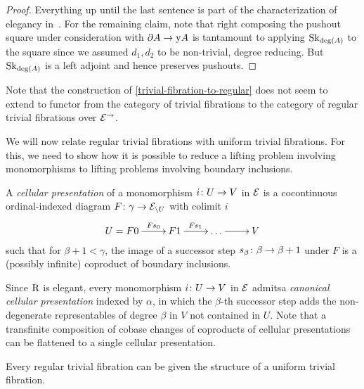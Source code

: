 \documentclass[reqno,10pt,a4paper,oneside]{amsart}
\begin{document}
\begin{proof}
Everything up until the last sentence is part of the characterization of elegancy in~\cite[Proposition~3.8]{bergner-rezk-elegant}.
For the remaining claim, note that right composing the pushout square under consideration with $\partial A \to \mathrm{y} A$ is tantamount to applying $\mathrm{Sk}_{\deg(A)}$ to the square since we assumed $d_1, d_2$ to be non-trivial, \ie degree reducing.
But $\mathrm{Sk}_{\deg(A)}$ is a left adjoint and hence preserves pushouts.
\end{proof}


Note that the construction of \cref{trivial-fibration-to-regular} does not seem to extend to functor from the category of trivial fibrations to the category of regular trivial fibrations over $\mathcal{E}^{\to}$.

\medskip

We will now relate regular trivial fibrations with uniform trivial fibrations.
For this, we need to show how it is possible to reduce a lifting problem involving monomorphisms to lifting problems involving boundary inclusions.

\begin{definition} A \emph{cellular presentation} of a monomorphism $i \colon U \to V$ in $\mathcal{E}$ is a cocontinuous ordinal-indexed diagram $F \colon \gamma \to \mathcal{E}_{\backslash U}$ with colimit $i$
\[
\xymatrix{
  U = F 0
  \ar[r]^-{F s_0}
&
  F 1
  \ar[r]^{F s_1}
&
  \ldots
  \ar[r]
&
  V
}
\]
such that for $\beta + 1 < \gamma$, the image of a successor step $s_{\beta} \colon \beta \to \beta + 1$ under $F$ is a (possibly infinite) coproduct of boundary inclusions.
\end{definition}

Since $\mathrm{R}$ is elegant, every monomorphism $i \colon U \to V$ in $\mathcal{E}$ admitsa \emph{canonical cellular presentation} indexed by $\alpha$, in which the $\beta$-th successor step adds the non-degenerate representables of degree $\beta$ in $V$ not contained in $U$.
Note that a transfinite composition of cobase changes of coproducts of cellular presentations can be flattened to a single cellular presentation.

\begin{proposition} \label{regular-trivial-fibration-to-uniform}
Every regular trivial fibration can be given the structure of a uniform trivial fibration.
\end{proposition}
\end{document}
